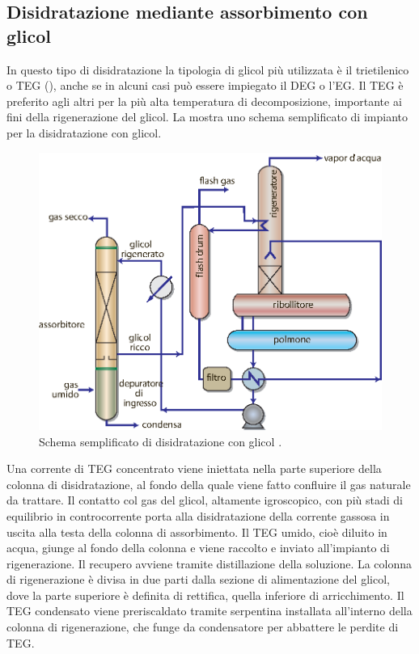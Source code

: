 \subsection{Disidratazione mediante assorbimento con glicol}
In questo tipo di disidratazione la tipologia di glicol più utilizzata è il trietilenico o TEG (), anche se in alcuni casi può essere impiegato il DEG o l'EG. Il TEG è preferito agli altri per la più alta temperatura di decomposizione, importante ai fini della rigenerazione del glicol. La  mostra uno schema semplificato di impianto per la disidratazione con glicol.
\begin{figure}[htbp]
    \centering
    \includegraphics[width=.7\textwidth]{fig/impianti/deidratazioneglicol.eps}
    \caption{Schema semplificato di disidratazione con glicol \parencite{bianco2005impiantigas}.}
    \label{fig:disidratazioneglicol}
\end{figure}
Una corrente di TEG concentrato viene iniettata nella parte superiore della colonna di disidratazione, al fondo della quale viene fatto confluire il gas naturale da trattare. Il contatto col gas del glicol, altamente igroscopico, con più stadi di equilibrio in controcorrente porta alla disidratazione della corrente gassosa in uscita alla testa della colonna di assorbimento. Il TEG umido, cioè diluito in acqua, giunge al fondo della colonna e viene raccolto e inviato all'impianto di rigenerazione. Il recupero avviene tramite distillazione della soluzione.
La colonna di rigenerazione è divisa in due parti dalla sezione di alimentazione del glicol, dove la parte superiore è definita di rettifica, quella inferiore di arricchimento. Il TEG condensato viene preriscaldato tramite serpentina installata all'interno della colonna di rigenerazione, che funge da condensatore per abbattere le perdite di TEG. \\
